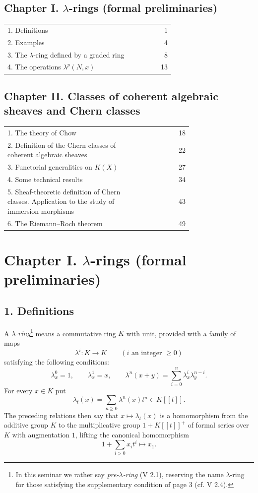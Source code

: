 \subsection*{Chapter I. $\lambda$-rings (formal preliminaries)}
\begin{longtable}{@{}p{0.74\linewidth}r@{}}
1. Definitions & 1\\
2. Examples & 4\\
3. The $\lambda$-ring defined by a graded ring & 8\\
4. The operations $\lambda^p(N,x)$ & 13\\
\end{longtable}

\subsection*{Chapter II. Classes of coherent algebraic sheaves and Chern classes}
\begin{longtable}{@{}p{0.74\linewidth}r@{}}
1. The theory of Chow & 18\\
2. Definition of the Chern classes of coherent algebraic sheaves & 22\\
3. Functorial generalities on $K(X)$ & 27\\
4. Some technical results & 34\\
5. Sheaf-theoretic definition of Chern classes. Application to the study of immersion morphisms & 43\\
6. The Riemann--Roch theorem & 49
\end{longtable}

\section*{Chapter I. $\lambda$-rings (formal preliminaries)}

\subsection*{1. Definitions}

A \emph{$\lambda$-ring}\footnote{In this seminar we rather say \emph{pre-$\lambda$-ring} (V 2.1), reserving the name $\lambda$-ring for those satisfying the supplementary condition of page 3 (cf. V 2.4).} means a commutative ring $K$ with unit, provided with a family of maps
\begin{equation}\tag{1.1}
\lambda^i:K\longrightarrow K\qquad (i\text{ an integer }\geq 0)
\end{equation}
satisfying the following conditions:
\begin{equation}\tag{1.2}
\lambda_x^0=1,\qquad \lambda_x^1=x,\qquad
\lambda^n(x+y)=\sum_{i=0}^n \lambda^i_x\lambda^{n-i}_y .
\end{equation}
For every $x\in K$ put
\begin{equation}\tag{1.3}
\lambda_t(x)=\sum_{n\geq 0}\lambda^n(x)t^n\in K[[t]].
\end{equation}
The preceding relations then say that $x\mapsto \lambda_t(x)$ is a homomorphism from the additive group $K$ to the multiplicative group $1+K[[t]]^+$ of formal series over $K$ with augmentation $1$, lifting the canonical homomorphism
\[
1+\sum_{i>0}x_it^i\longmapsto x_1.
\]

